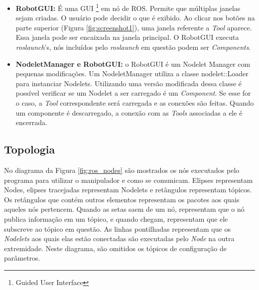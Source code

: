 \begin{itemize}
\item \textbf{RobotGUI:} É uma GUI \footnote{Guided User Interface} em nó de ROS. Permite que múltiplas janelas sejam criadas. O usuário pode decidir o que é exibido. Ao clicar nos botões na parte superior (Figura \ref{fig:screenshot1}), uma janela referente a \textit{Tool} aparece. Essa janela pode ser encaixada na janela principal. O RobotGUI executa \textit{roslaunch}'s, nós incluídos pelo \textit{roslaunch} em questão podem ser \textit{Components}. 

\item \textbf{NodeletManager e RobotGUI:} o RobotGUI é um Nodelet Manager com pequenas modificações. Um NodeletManager utiliza a classe nodelet::Loader para instanciar Nodelets. Utilizando uma versão modificada dessa classe é possível verificar se um Nodelet a ser carregado é um \textit{Component}. Se esse for o caso, a \textit{Tool} correspondente será carregada e as conexões são feitas. Quando um componente é descarregado, a conexão com as \textit{Tools} associadas a ele é encerrada.
\end{itemize}



\subsection{Topologia}

No diagrama da Figura \ref{fig:ros_nodes} são mostrados os nós executados pelo programa para utilizar o manipulador e como se comunicam. Elipses representam Nodes, elipses tracejadas representam Nodelets e retângulos representam tópicos. Os retângulos que contém outros elementos representam os pacotes aos quais aqueles nós pertencem. Quando as setas saem de um nó, representam que o nó publica informação em um tópico, e quando chegam, representam que ele subscreve ao tópico em questão. As linhas pontilhadas representam que os \textit{Nodelets} aos quais elas estão conectadas são executadas pelo \textit{Node} na outra extremidade. Neste diagrama, são omitidos os tópicos de configuração de parâmetros.

